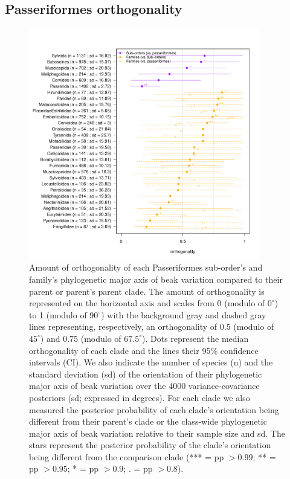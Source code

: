 \documentclass[12pt,a4paper]{article}
\begin{document}
\newpage

\subsection{Passeriformes orthogonality}

\begin{figure}[H]
\centering
   \includegraphics[width=0.9\textwidth]{Figures/orthogonality_results_passeriformes.pdf}
\caption{Amount of orthogonality of each Passeriformes sub-order's and family's phylogenetic major axis of beak variation compared to their parent or parent's parent clade.
The amount of orthogonality is represented on the horizontal axis and scales from 0 (modulo of $0^\circ$) to 1 (modulo of $90^\circ$) with the background gray and dashed gray lines representing, respectively, an orthogonality of 0.5 (modulo of $45^\circ$) and 0.75 (modulo of $67.5^\circ$).
Dots represent the median orthogonality of each clade and the lines their 95\% confidence intervals (CI).
We also indicate the number of species (n) and the standard deviation (sd) of the orientation of their phylogenetic major axis of beak variation over the 4000 variance-covariance posteriors (sd; expressed in degrees).
For each clade we also measured the posterior probability of each clade's orientation being different from their parent's clade or the class-wide phylogenetic major axis of beak variation relative to their sample size and sd.
The stars represent the posterior probability of the clade's orientation being different from the comparison clade (*** = pp $> 0.99$; ** = pp $>0.95$; * = pp $> 0.9$; . = pp $> 0.8$).}
\label{fig_orthogonality_passeriformes}
\end{figure}
\end{document}
